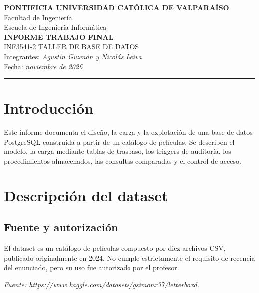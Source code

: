 \documentclass[11pt,a4paper]{article}
\begin{document}
\begin{center}
    {\large\bfseries PONTIFICIA UNIVERSIDAD CATÓLICA DE VALPARAÍSO}\\[0.3em]
    Facultad de Ingeniería\\[0.2em]
    Escuela de Ingeniería Informática\\[1.2em]
    {\Large\bfseries INFORME TRABAJO FINAL}\\[0.4em]
    INF3541-2 \quad TALLER DE BASE DE DATOS\\[0.8em]
    Integrantes: \textit{Agustín Guzmán y Nicolás Leiva}\\
    Fecha: \textit{noviembre de 2026}
\end{center}

\vspace{0.4em}
\hrule
\vspace{1em}

\section{Introducción}

Este informe documenta el diseño, la carga y la explotación de una base de
datos PostgreSQL construida a partir de un catálogo de películas. Se describen
el modelo, la carga mediante tablas de traspaso, los triggers de auditoría, los
procedimientos almacenados, las consultas comparadas y el control de acceso.

\section{Descripción del dataset}

\subsection{Fuente y autorización}

El dataset es un catálogo de películas compuesto por diez archivos CSV,
publicado originalmente en 2024. No cumple estrictamente el requisito de
recencia del enunciado, pero su uso fue autorizado por el profesor.

\textit{Fuente: \url{https://www.kaggle.com/datasets/gsimonx37/letterboxd}.}
\end{document}
